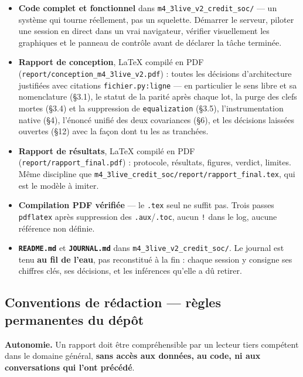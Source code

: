 \documentclass[11pt,a4paper]{article}
\newcommand{\code}[1]{\texttt{#1}}
\begin{document}
\begin{itemize}
\item \textbf{Code complet et fonctionnel} dans \code{m4\_3live\_v2\_credit\_soc/} --- un système qui tourne réellement, pas un squelette. Démarrer le serveur, piloter une session en direct dans un vrai navigateur, vérifier visuellement les graphiques et le panneau de contrôle avant de déclarer la tâche terminée.
\item \textbf{Rapport de conception}, LaTeX compilé en PDF (\code{report/conception\_m4\_3live\_v2.pdf}) : toutes les décisions d'architecture justifiées avec citations \code{fichier.py:ligne} --- en particulier le sens libre et sa nomenclature (§3.1), le statut de la parité après chaque lot, la purge des clefs mortes (§3.4) et la suppression de \code{equalization} (§3.5), l'instrumentation native (§4), l'énoncé unifié des deux covariances (§6), et les décisions laissées ouvertes (§12) avec la façon dont tu les as tranchées.
\item \textbf{Rapport de résultats}, LaTeX compilé en PDF (\code{report/rapport\_final.pdf}) : protocole, résultats, figures, verdict, limites. Même discipline que \code{m4\_3live\_credit\_soc/report/rapport\_final.tex}, qui est le modèle à imiter.
\item \textbf{Compilation PDF vérifiée} --- le \code{.tex} seul ne suffit pas. Trois passes \code{pdflatex} après suppression des \code{.aux}/\code{.toc}, aucun \code{!} dans le log, aucune référence non définie.
\item \textbf{\code{README.md}} et \textbf{\code{JOURNAL.md}} dans \code{m4\_3live\_v2\_credit\_soc/}. Le journal est tenu \textbf{au fil de l'eau}, pas reconstitué à la fin : chaque session y consigne ses chiffres clés, ses décisions, et les inférences qu'elle a dû retirer.
\end{itemize}

\subsection*{Conventions de rédaction --- règles permanentes du dépôt}

\textbf{Autonomie.} Un rapport doit être compréhensible par un lecteur tiers compétent dans le domaine général, \textbf{sans accès aux données, au code, ni aux conversations qui l'ont précédé}.
\end{document}
